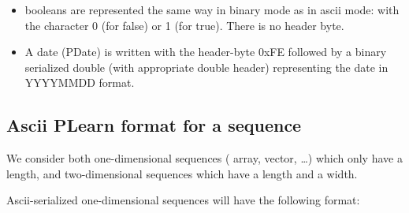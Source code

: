 \documentclass[11pt]{book}
\begin{document}
\begin{itemize}
\item booleans are represented the same way in binary mode as in ascii mode: with the character 0 (for false) or 1 (for true). There is no header byte.
\item A date (PDate) is written with the header-byte 0xFE followed by a
  binary serialized double (with appropriate double header) representing the date in YYYYMMDD format.
\end{itemize}


\subsection{Ascii PLearn format for a sequence}
\label{ascii-sequence}

We consider both one-dimensional sequences ( array, vector, \ldots) which only have a length,
and two-dimensional sequences which have a length and a width.

Ascii-serialized one-dimensional sequences will have the following format:
\end{document}
